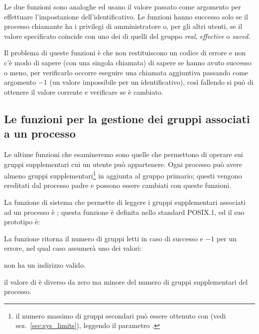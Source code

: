 Le due funzioni sono analoghe ed usano il valore passato come argomento per
effettuare l'impostazione dell'identificativo.  Le funzioni hanno successo
solo se il processo chiamante ha i privilegi di amministratore o, per gli
altri utenti, se il valore specificato coincide con uno dei di quelli del
gruppo \textit{real}, \textit{effective} o \textit{saved}.

Il problema di queste funzioni è che non restituiscono un codice di errore e
non c'è modo di sapere (con una singola chiamata) di sapere se hanno avuto
successo o meno, per verificarlo occorre eseguire una chiamata aggiuntiva
passando come argomento $-1$ (un valore impossibile per un identificativo),
così fallendo si può di ottenere il valore corrente e verificare se è
cambiato.

\subsection{Le funzioni per la gestione dei gruppi associati a un processo}
\label{sec:proc_setgroups}

Le ultime funzioni che esamineremo sono quelle che permettono di operare sui
gruppi supplementari cui un utente può appartenere. Ogni processo può avere
almeno  gruppi supplementari\footnote{il numero massimo di
  gruppi secondari può essere ottenuto con  (vedi
  sez.~\ref{sec:sys_limits}), leggendo il parametro
  .} in aggiunta al gruppo primario; questi vengono
ereditati dal processo padre e possono essere cambiati con queste funzioni.

La funzione di sistema che permette di leggere i gruppi supplementari
associati ad un processo è ; questa funzione è definita nello
standard POSIX.1, ed il suo prototipo è:

\begin{funcproto}{ 
}
{La funzione ritorna il numero di gruppi letti in caso di successo e $-1$ per
  un errore, nel qual caso  assumerà uno dei valori:
\begin{errlist}
\item[\errcode{EFAULT}]  non ha un indirizzo valido.
\item[\errcode{EINVAL}] il valore di  è diverso da zero ma
  minore del numero di gruppi supplementari del processo.
\end{errlist}}
\end{funcproto}

